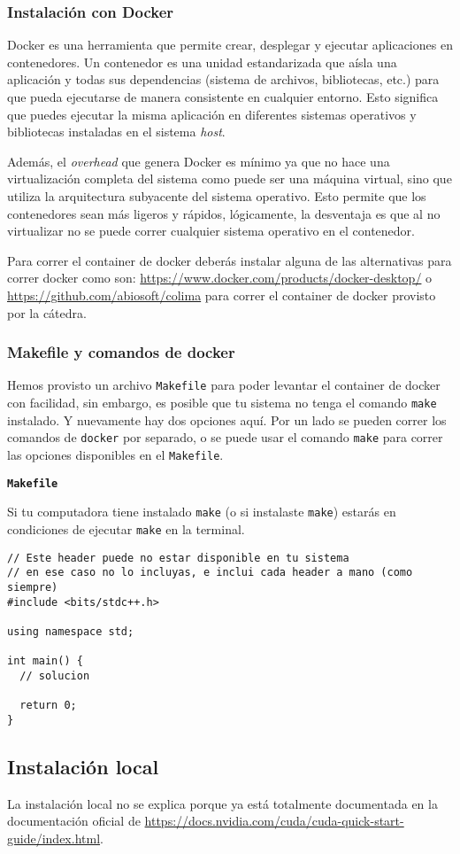 \subsubsection{Instalación con Docker}

Docker es una herramienta que permite crear, desplegar y ejecutar aplicaciones en contenedores. Un contenedor es una
unidad estandarizada que aísla una aplicación y todas sus dependencias (sistema de archivos, bibliotecas, etc.) para que
pueda ejecutarse de manera consistente en cualquier entorno. Esto significa que puedes ejecutar la misma aplicación en
diferentes sistemas operativos y bibliotecas instaladas en el sistema \textit{host}.

Además, el \textit{overhead} que genera Docker es mínimo ya que no hace una virtualización completa del sistema como
puede ser una máquina virtual, sino que utiliza la arquitectura subyacente del sistema operativo. Esto permite que los
contenedores sean más ligeros y rápidos, lógicamente, la desventaja es que al no virtualizar no se puede correr
cualquier sistema operativo en el contenedor.

Para correr el container de docker deberás instalar alguna de las alternativas para correr docker como son: \href{Docker
Desktop}{https://www.docker.com/products/docker-desktop/} o \href{Colima}{https://github.com/abiosoft/colima} para
correr el container de docker provisto por la cátedra.

\subsubsection{Makefile y comandos de docker}

Hemos provisto un archivo \texttt{Makefile} para poder levantar el container de docker con facilidad, sin embargo, es
posible que tu sistema no tenga el comando \texttt{make} instalado. Y nuevamente hay dos opciones aquí. Por un lado se
pueden correr los comandos de \texttt{docker} por separado, o se puede usar el comando \texttt{make} para correr las
opciones disponibles en el \texttt{Makefile}.

\textbf{\texttt{Makefile}}

Si tu computadora tiene instalado \texttt{make} (o si instalaste \texttt{make}) estarás en condiciones de ejecutar
\texttt{make} en la terminal.

\begin{lstlisting}
// Este header puede no estar disponible en tu sistema
// en ese caso no lo incluyas, e inclui cada header a mano (como siempre)
#include <bits/stdc++.h>

using namespace std;

int main() {
  // solucion

  return 0;
}
\end{lstlisting}

\subsection{Instalación local}

La instalación local no se explica porque ya está totalmente documentada en la documentación oficial de \href{CUDA de
Nvidia}{https://docs.nvidia.com/cuda/cuda-quick-start-guide/index.html}.




